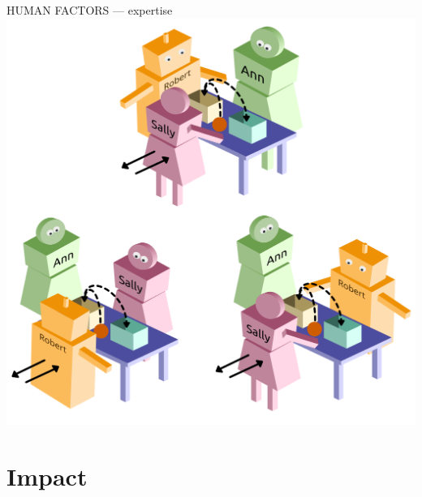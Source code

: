 \documentclass[xcolor=table]{beamer}
\begin{document}
\begin{frame}{HUMAN FACTORS --- expertise}
            \hyperlink{constructs}{\includegraphics[height=0.2\paperheight]{triadic_false_beliefs}}
\end{frame}

\section*{Impact}
\end{document}
